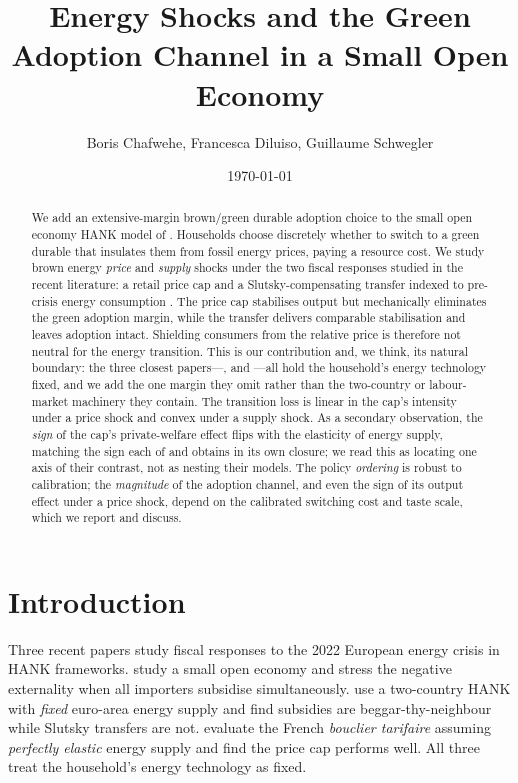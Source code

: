\documentclass[11pt,a4paper]{article}
\title{\textbf{Energy Shocks and the Green Adoption Channel in a Small Open Economy}}
\author{Boris Chafwehe, Francesca Diluiso, Guillaume Schwegler}
\date{\today}
\begin{document}
\maketitle

\begin{abstract}
\noindent We add an extensive-margin brown/green durable adoption choice to the
small open economy HANK model of \citet{ARS2024}. Households choose discretely
whether to switch to a green durable that insulates them from fossil energy
prices, paying a resource cost. We study brown energy \emph{price} and
\emph{supply} shocks under the two fiscal responses studied in the recent
literature: a retail price cap \citep{Langot2026} and a Slutsky-compensating
transfer indexed to pre-crisis energy consumption \citep{Bayer2026}. The price
cap stabilises output but mechanically eliminates the green adoption margin,
while the transfer delivers comparable stabilisation and leaves adoption
intact. Shielding consumers from the relative price is therefore not neutral
for the energy transition. This is our contribution and, we think, its natural
boundary: the three closest papers---\citet{ARS2024}, \citet{Bayer2026} and
\citet{Langot2026}---all hold the household's energy technology fixed, and we
add the one margin they omit rather than the two-country or labour-market
machinery they contain. The transition loss is linear in the cap's intensity
under a price shock and convex under a supply shock. As a secondary
observation, the \emph{sign} of the cap's private-welfare effect flips with the
elasticity of energy supply, matching the sign each of \citet{Langot2026} and
\citet{Bayer2026} obtains in its own closure; we read this as locating one axis
of their contrast, not as nesting their models. The policy \emph{ordering} is
robust to calibration; the \emph{magnitude} of the adoption channel, and even
the sign of its output effect under a price shock, depend on the calibrated
switching cost and taste scale, which we report and discuss.
\end{abstract}

\section{Introduction}

Three recent papers study fiscal responses to the 2022 European energy crisis
in HANK frameworks. \citet{ARS2024} study a small open economy and stress the
negative externality when all importers subsidise simultaneously.
\citet{Bayer2026} use a two-country HANK with \emph{fixed} euro-area energy
supply and find subsidies are beggar-thy-neighbour while Slutsky transfers are
not. \citet{Langot2026} evaluate the French \emph{bouclier tarifaire} assuming
\emph{perfectly elastic} energy supply and find the price cap performs well.
All three treat the household's energy technology as fixed.
\end{document}
